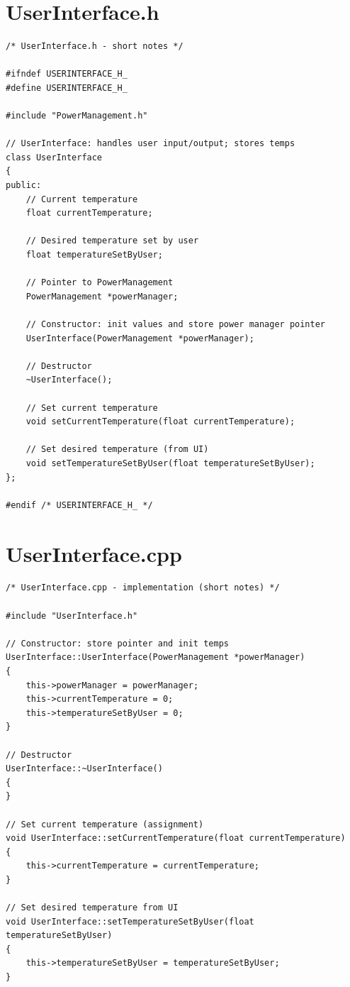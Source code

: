 \documentclass[11pt]{article}
\begin{document}
\section*{UserInterface.h}
\begin{lstlisting}
/* UserInterface.h - short notes */

#ifndef USERINTERFACE_H_
#define USERINTERFACE_H_

#include "PowerManagement.h"

// UserInterface: handles user input/output; stores temps
class UserInterface
{
public:
    // Current temperature
    float currentTemperature;

    // Desired temperature set by user
    float temperatureSetByUser;

    // Pointer to PowerManagement
    PowerManagement *powerManager;

    // Constructor: init values and store power manager pointer
    UserInterface(PowerManagement *powerManager);

    // Destructor
    ~UserInterface();

    // Set current temperature
    void setCurrentTemperature(float currentTemperature);

    // Set desired temperature (from UI)
    void setTemperatureSetByUser(float temperatureSetByUser);
};

#endif /* USERINTERFACE_H_ */
\end{lstlisting}

\section*{UserInterface.cpp}
\begin{lstlisting}
/* UserInterface.cpp - implementation (short notes) */

#include "UserInterface.h"

// Constructor: store pointer and init temps
UserInterface::UserInterface(PowerManagement *powerManager)
{
    this->powerManager = powerManager;
    this->currentTemperature = 0;
    this->temperatureSetByUser = 0;
}

// Destructor
UserInterface::~UserInterface()
{
}

// Set current temperature (assignment)
void UserInterface::setCurrentTemperature(float currentTemperature)
{
    this->currentTemperature = currentTemperature;
}

// Set desired temperature from UI
void UserInterface::setTemperatureSetByUser(float temperatureSetByUser)
{
    this->temperatureSetByUser = temperatureSetByUser;
}
\end{lstlisting}
\end{document}
